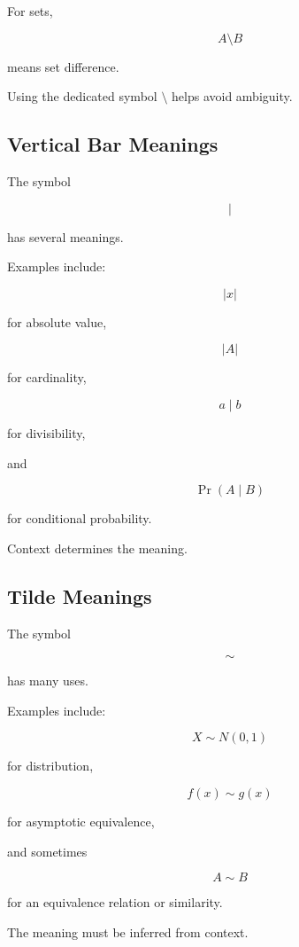For sets,

\[
A\setminus B
\]

means set difference.

Using the dedicated symbol \(\setminus\) helps avoid ambiguity.

\subsection{Vertical Bar Meanings}
\label{subsec:vertical-bar-meanings}

The symbol

\[
|
\]

has several meanings.

Examples include:

\[
\boxed{
|x|
}
\]

for absolute value,

\[
\boxed{
|A|
}
\]

for cardinality,

\[
\boxed{
a\mid b
}
\]

for divisibility,

and

\[
\boxed{
\Pr(A\mid B)
}
\]

for conditional probability.

Context determines the meaning.

\subsection{Tilde Meanings}
\label{subsec:tilde-meanings}

The symbol

\[
\sim
\]

has many uses.

Examples include:

\[
\boxed{
X\sim N(0,1)
}
\]

for distribution,

\[
\boxed{
f(x)\sim g(x)
}
\]

for asymptotic equivalence,

and sometimes

\[
\boxed{
A\sim B
}
\]

for an equivalence relation or similarity.

The meaning must be inferred from context.

